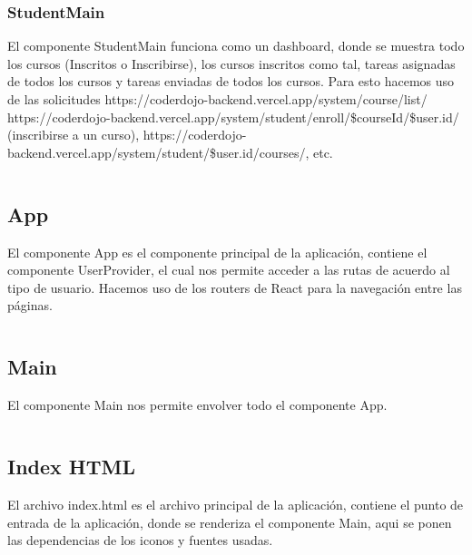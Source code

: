 \documentclass{article}
\begin{document}
\subsubsection{StudentMain}
El componente StudentMain funciona como un dashboard, donde se muestra todo los cursos (Inscritos o Inscribirse), los cursos inscritos como tal, tareas asignadas de todos los cursos y tareas enviadas de todos los cursos. Para esto hacemos uso de las solicitudes https://coderdojo-backend.vercel.app/system/course/list/ https://coderdojo-backend.vercel.app/system/student/enroll/\${courseId}/\${user.id}/ (inscribirse a un curso), https://coderdojo-backend.vercel.app/system/student/\${user.id}/courses/, etc.
\inputminted{javascript}{../fronted/src/designUI/Student/StudentMain.jsx}

\subsection{App}
El componente App es el componente principal de la aplicación, contiene el componente UserProvider, el cual nos permite acceder a las rutas de acuerdo al tipo de usuario. Hacemos uso de los routers de React para la navegación entre las páginas.
\inputminted{javascript}{../fronted/src/App.jsx}
\subsection{Main}
El componente Main nos permite envolver todo el componente App.
\inputminted{javascript}{../fronted/src/main.jsx}

\subsection{Index HTML}
El archivo index.html es el archivo principal de la aplicación, contiene el punto de entrada de la aplicación, donde se renderiza el componente Main, aqui se ponen las dependencias de los iconos y fuentes usadas.
\inputminted{html}{../fronted/index.html}
\end{document}
